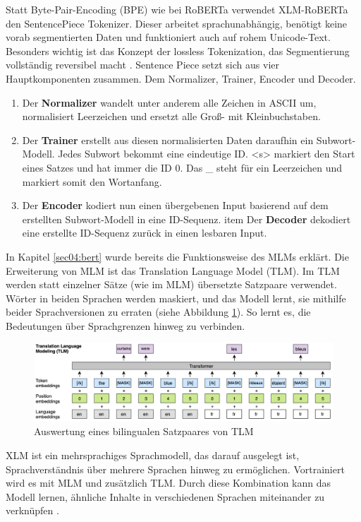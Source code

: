 Statt Byte-Pair-Encoding (BPE) wie bei RoBERTa verwendet XLM-RoBERTa den SentencePiece Tokenizer.
Dieser arbeitet sprachunabhängig, benötigt keine vorab segmentierten Daten und funktioniert auch auf rohem Unicode-Text. 
Besonders wichtig ist das Konzept der lossless Tokenization, das Segmentierung vollständig reversibel macht \cite{kudo-richardson-2018-sentencepiece}.
Sentence Piece setzt sich aus vier Hauptkomponenten zusammen. Dem Normalizer, Trainer, Encoder und Decoder. 

\begin{enumerate}
    \item Der \textbf{Normalizer} wandelt unter anderem alle Zeichen in ASCII um, normalisiert Leerzeichen und ersetzt alle Groß- mit Kleinbuchstaben.
    \item Der \textbf{Trainer} erstellt aus diesen normalisierten Daten daraufhin ein Subwort-Modell. Jedes Subwort bekommt eine eindeutige ID.
     <s> markiert den Start eines Satzes und hat immer die ID 0. Das \_ steht für ein Leerzeichen und markiert somit den Wortanfang.
    \item Der \textbf{Encoder} kodiert nun einen übergebenen Input basierend auf dem erstellten Subwort-Modell in eine ID-Sequenz.
    item Der \textbf{Decoder} dekodiert eine erstellte ID-Sequenz zurück in einen lesbaren Input.
\end{enumerate}

In Kapitel \ref{sec04:bert} wurde bereits die Funktionsweise des MLMs erklärt. Die Erweiterung von MLM ist das Translation Language Model (TLM).
Im TLM werden statt einzelner Sätze (wie im MLM) übersetzte Satzpaare verwendet. Wörter in beiden Sprachen werden maskiert, und das Modell lernt, 
sie mithilfe beider Sprachversionen zu erraten (siehe Abbildung \ref{fig:translation_language_modeling}). So lernt es, die Bedeutungen über Sprachgrenzen hinweg zu 
verbinden.

\begin{figure}[htbp]
    \begin{center}
    \includegraphics[width=\linewidth]{static/translation_language_modeling.png}
    \caption{\label{fig:translation_language_modeling} Auswertung eines bilingualen Satzpaares von TLM \cite{NEURIPS2019_c04c19c2}}
    \end{center}
\end{figure}

XLM ist ein mehrsprachiges Sprachmodell, das darauf ausgelegt ist, Sprachverständnis über mehrere Sprachen hinweg zu ermöglichen.
Vortrainiert wird es mit MLM und zusätzlich TLM.
Durch diese Kombination kann das Modell lernen, ähnliche Inhalte in verschiedenen Sprachen miteinander zu verknüpfen \cite{NEURIPS2019_c04c19c2}.